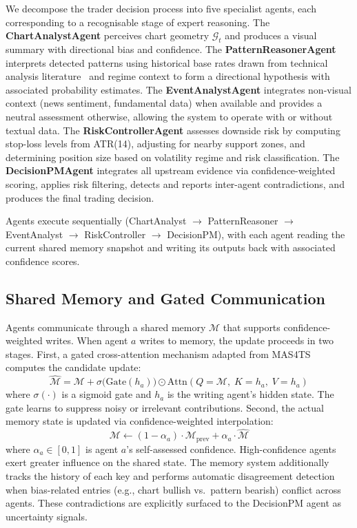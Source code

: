 We decompose the trader decision process into five specialist agents, each corresponding to a recognisable stage of expert reasoning. The \textbf{ChartAnalystAgent} perceives chart geometry $\mathcal{G}_t$ and produces a visual summary with directional bias and confidence. The \textbf{PatternReasonerAgent} interprets detected patterns using historical base rates drawn from technical analysis literature~\cite{bulkowski2005encyclopedia} and regime context to form a directional hypothesis with associated probability estimates. The \textbf{EventAnalystAgent} integrates non-visual context (news sentiment, fundamental data) when available and provides a neutral assessment otherwise, allowing the system to operate with or without textual data. The \textbf{RiskControllerAgent} assesses downside risk by computing stop-loss levels from ATR(14), adjusting for nearby support zones, and determining position size based on volatility regime and risk classification. The \textbf{DecisionPMAgent} integrates all upstream evidence via confidence-weighted scoring, applies risk filtering, detects and reports inter-agent contradictions, and produces the final trading decision.

Agents execute sequentially (ChartAnalyst $\rightarrow$ PatternReasoner $\rightarrow$ EventAnalyst $\rightarrow$ RiskController $\rightarrow$ DecisionPM), with each agent reading the current shared memory snapshot and writing its outputs back with associated confidence scores.

\subsection{Shared Memory and Gated Communication}
\label{sec:memory}

Agents communicate through a shared memory $\mathcal{M}$ that supports confidence-weighted writes. When agent $a$ writes to memory, the update proceeds in two stages. First, a gated cross-attention mechanism adapted from MAS4TS~\cite{mas4ts2025} computes the candidate update:
\begin{equation}
    \hat{\mathcal{M}} = \mathcal{M} + \sigma\big(\text{Gate}(h_a)\big) \odot \text{Attn}(Q{=}\mathcal{M},\; K{=}h_a,\; V{=}h_a)
\end{equation}
where $\sigma(\cdot)$ is a sigmoid gate and $h_a$ is the writing agent's hidden state. The gate learns to suppress noisy or irrelevant contributions. Second, the actual memory state is updated via confidence-weighted interpolation:
\begin{equation}
    \mathcal{M} \leftarrow (1 - \alpha_a) \cdot \mathcal{M}_{\text{prev}} + \alpha_a \cdot \hat{\mathcal{M}}
\end{equation}
where $\alpha_a \in [0,1]$ is agent $a$'s self-assessed confidence. High-confidence agents exert greater influence on the shared state. The memory system additionally tracks the history of each key and performs automatic disagreement detection when bias-related entries (e.g., chart bullish vs.\ pattern bearish) conflict across agents. These contradictions are explicitly surfaced to the DecisionPM agent as uncertainty signals.

